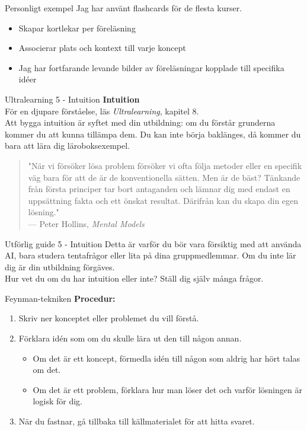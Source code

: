 \documentclass[presentation]{beamer}
\begin{document}
\begin{frame}{Personligt exempel}
Jag har använt flashcards för de flesta kurser.

\begin{itemize}
    \item Skapar kortlekar per föreläsning
    \item Associerar plats och kontext till varje koncept
    \item Jag har fortfarande levande bilder av föreläsningar kopplade till specifika idéer
\end{itemize}
\end{frame}

\begin{frame}{Ultralearning 5 - Intuition}
  \textbf{Intuition}
  \\
  För en djupare förståelse, läs \textit{Ultralearning}, kapitel 8.
  \\
  Att bygga intuition är syftet med din utbildning: om du förstår grunderna kommer du att kunna tillämpa dem. Du kan inte börja baklänges, då kommer du bara att lära dig läroboksexempel.
  \\
  \begin{quote}
  \small "När vi försöker lösa problem försöker vi ofta följa metoder eller en specifik väg bara för att de är de konventionella sätten. Men är de bäst? Tänkande från första principer tar bort antaganden och lämnar dig med endast en uppsättning fakta och ett önskat resultat. Därifrån kan du skapa din egen lösning."\\
  — Peter Hollins, \textit{Mental Models}
  \end{quote}
\end{frame}

\begin{frame}{Utförlig guide 5 - Intuition}
  Detta är varför du bör vara försiktig med att använda AI, bara studera tentafrågor eller lita på dina gruppmedlemmar. Om du inte lär dig är din utbildning förgäves.
  \\
  Hur vet du om du har intuition eller inte? Ställ dig själv många frågor.
\end{frame}

\begin{frame}{Feynman-tekniken}
  \textbf{Procedur:}
  \begin{enumerate}
    \item Skriv ner konceptet eller problemet du vill förstå.
    \item Förklara idén som om du skulle lära ut den till någon annan.
    \begin{itemize}
      \item Om det är ett koncept, förmedla idén till någon som aldrig har hört talas om det.
      \item Om det är ett problem, förklara hur man löser det och varför lösningen är logisk för dig.
    \end{itemize}
    \item När du fastnar, gå tillbaka till källmaterialet för att hitta svaret.
  \end{enumerate}
\end{frame}
\end{document}
